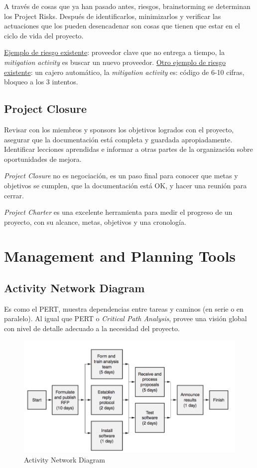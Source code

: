 \documentclass[oneside]{book}
\begin{document}
A través de cosas que ya han pasado antes, riesgos, brainstorming se determinan los Project Risks. Después de identificarlos, minimizarlos y verificar las actuaciones que los pueden desencadenar son cosas que tienen que estar en el ciclo de vida del proyecto. 

\underline{Ejemplo de riesgo existente}: proveedor clave que no entrega a tiempo, la \textit{mitigation activity} es buscar un nuevo proveedor.
\underline{Otro ejemplo de riesgo existente}: un cajero automático, la \textit{mitigation activity} es: código de 6-10 cifras, bloqueo a los 3 intentos.

\section{Project Closure}

Revisar con los miembros y sponsors los objetivos logrados con el proyecto, asegurar que la documentación está completa y guardada apropiadamente. Identificar lecciones aprendidas e informar a otras partes de la organización sobre oportunidades de mejora.

\textit{Project Closure} no es negociación, es un paso final para conocer que metas y objetivos se cumplen, que la documentación está OK, y hacer una reunión para cerrar.

\textit{Project Charter} es una excelente herramienta para medir el progreso de un proyecto, con su alcance, metas, objetivos y una cronología.

\chapter{Management and Planning Tools}

\section{Activity Network Diagram}
Es como el PERT, muestra dependencias entre tareas y caminos (en serie o en paralelo). Al igual que PERT o \textit{Critical Path Analysis}, provee una visión global con nivel de detalle adecuado a la necesidad del proyecto.

\begin{figure}[ht!]
	\centering
	\includegraphics[width=120mm]{imagenes/AND.png}
	\caption{Activity Network Diagram}
	\label{fig:ANDDiagram}
\end{figure}
\end{document}

